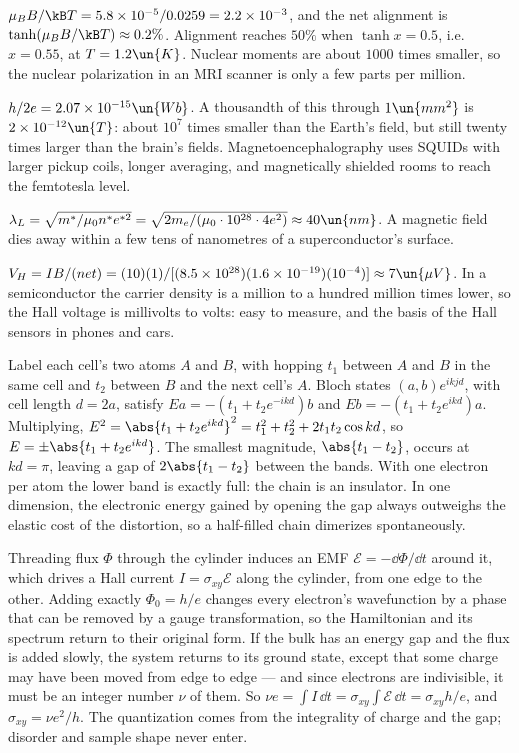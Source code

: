  $\mu_BB/\kB T = 5.8\times10^{-5}/0.0259 = 2.2\times10^{-3}$, and the net alignment is $\tanh(\mu_BB/\kB T)\approx0.2\%$. Alignment reaches $50\%$ when $\tanh x = 0.5$, i.e.\ $x = 0.55$, at $T = 1.2\un{K}$. Nuclear moments are about $1000$ times smaller, so the nuclear polarization in an MRI scanner is only a few parts per million.

 $h/2e = 2.07\times10^{-15}\un{Wb}$. A thousandth of this through $1\un{mm^2}$ is $2\times10^{-12}\un{T}$: about $10^7$ times smaller than the Earth's field, but still twenty times larger than the brain's fields. Magnetoencephalography uses SQUIDs with larger pickup coils, longer averaging, and magnetically shielded rooms to reach the femtotesla level.

 $\lambda_L = \sqrt{m^*/\mu_0n^*e^{*2}} = \sqrt{2m_e/(\mu_0\cdot10^{28}\cdot4e^2)}\approx40\un{nm}$. A magnetic field dies away within a few tens of nanometres of a superconductor's surface.

 $V_H = IB/(net) = (10)(1)/[(8.5\times10^{28})(1.6\times10^{-19})(10^{-4})]\approx7\un{\mu V}$. In a semiconductor the carrier density is a million to a hundred million times lower, so the Hall voltage is millivolts to volts: easy to measure, and the basis of the Hall sensors in phones and cars.

 Label each cell's two atoms $A$ and $B$, with hopping $t_1$ between $A$ and $B$ in the same cell and $t_2$ between $B$ and the next cell's $A$. Bloch states $(a,b)e^{ikjd}$, with cell length $d = 2a$, satisfy $Ea = -(t_1 + t_2e^{-ikd})b$ and $Eb = -(t_1 + t_2e^{ikd})a$. Multiplying, $E^2 = \abs{t_1+t_2e^{ikd}}^2 = t_1^2 + t_2^2 + 2t_1t_2\cos kd$, so $E = \pm\abs{t_1+t_2e^{ikd}}$. The smallest magnitude, $\abs{t_1-t_2}$, occurs at $kd = \pi$, leaving a gap of $2\abs{t_1-t_2}$ between the bands. With one electron per atom the lower band is exactly full: the chain is an insulator. In one dimension, the electronic energy gained by opening the gap always outweighs the elastic cost of the distortion, so a half-filled chain dimerizes spontaneously.

 Threading flux $\Phi$ through the cylinder induces an EMF $\mathcal{E} = -\dd\Phi/\dd t$ around it, which drives a Hall current $I = \sigma_{xy}\mathcal{E}$ along the cylinder, from one edge to the other. Adding exactly $\Phi_0 = h/e$ changes every electron's wavefunction by a phase that can be removed by a gauge transformation, so the Hamiltonian and its spectrum return to their original form. If the bulk has an energy gap and the flux is added slowly, the system returns to its ground state, except that some charge may have been moved from edge to edge --- and since electrons are indivisible, it must be an integer number $\nu$ of them. So $\nu e = \int I\,\dd t = \sigma_{xy}\int\mathcal{E}\,\dd t = \sigma_{xy}h/e$, and $\sigma_{xy} = \nu e^2/h$. The quantization comes from the integrality of charge and the gap; disorder and sample shape never enter.
